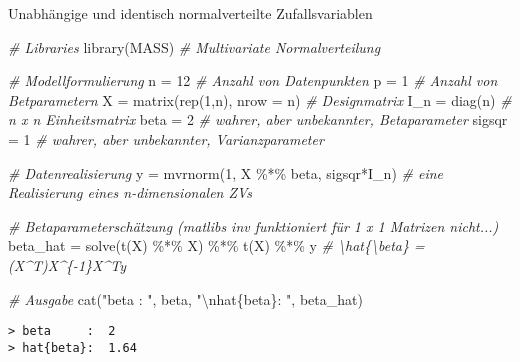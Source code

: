 \documentclass[
  8pt,
  ignorenonframetext,
]{beamer}
\newenvironment{Shaded}{\begin{snugshade}}{\end{snugshade}}
\newcommand{\AttributeTok}[1]{\textcolor[rgb]{0.77,0.63,0.00}{#1}}
\newcommand{\CommentTok}[1]{\textcolor[rgb]{0.56,0.35,0.01}{\textit{#1}}}
\newcommand{\DecValTok}[1]{\textcolor[rgb]{0.00,0.00,0.81}{#1}}
\newcommand{\FunctionTok}[1]{\textcolor[rgb]{0.00,0.00,0.00}{#1}}
\newcommand{\NormalTok}[1]{#1}
\newcommand{\OtherTok}[1]{\textcolor[rgb]{0.56,0.35,0.01}{#1}}
\newcommand{\SpecialCharTok}[1]{\textcolor[rgb]{0.00,0.00,0.00}{#1}}
\newcommand{\StringTok}[1]{\textcolor[rgb]{0.31,0.60,0.02}{#1}}
\begin{document}
\begin{frame}[fragile]{Unabhängige und identisch normalverteilte
Zufallsvariablen}
\protect\hypertarget{unabhuxe4ngige-und-identisch-normalverteilte-zufallsvariablen-3}{}
\footnotesize

\begin{Shaded}
\begin{Highlighting}[]
\CommentTok{\# Libraries}
\FunctionTok{library}\NormalTok{(MASS)                                    }\CommentTok{\# Multivariate Normalverteilung }

\CommentTok{\# Modellformulierung}
\NormalTok{n         }\OtherTok{=} \DecValTok{12}                                   \CommentTok{\# Anzahl von Datenpunkten}
\NormalTok{p         }\OtherTok{=} \DecValTok{1}                                    \CommentTok{\# Anzahl von Betparametern}
\NormalTok{X         }\OtherTok{=} \FunctionTok{matrix}\NormalTok{(}\FunctionTok{rep}\NormalTok{(}\DecValTok{1}\NormalTok{,n), }\AttributeTok{nrow =}\NormalTok{ n)           }\CommentTok{\# Designmatrix}
\NormalTok{I\_n       }\OtherTok{=} \FunctionTok{diag}\NormalTok{(n)                              }\CommentTok{\# n x n Einheitsmatrix}
\NormalTok{beta      }\OtherTok{=} \DecValTok{2}                                    \CommentTok{\# wahrer, aber unbekannter, Betaparameter}
\NormalTok{sigsqr    }\OtherTok{=} \DecValTok{1}                                    \CommentTok{\# wahrer, aber unbekannter, Varianzparameter}

\CommentTok{\# Datenrealisierung}
\NormalTok{y        }\OtherTok{=}  \FunctionTok{mvrnorm}\NormalTok{(}\DecValTok{1}\NormalTok{, X }\SpecialCharTok{\%*\%}\NormalTok{ beta, sigsqr}\SpecialCharTok{*}\NormalTok{I\_n)   }\CommentTok{\# eine Realisierung eines n{-}dimensionalen ZVs}

\CommentTok{\# Betaparameterschätzung (matlib\textquotesingle{}s inv funktioniert für 1 x 1 Matrizen nicht...)}
\NormalTok{beta\_hat }\OtherTok{=} \FunctionTok{solve}\NormalTok{(}\FunctionTok{t}\NormalTok{(X) }\SpecialCharTok{\%*\%}\NormalTok{ X) }\SpecialCharTok{\%*\%} \FunctionTok{t}\NormalTok{(X) }\SpecialCharTok{\%*\%}\NormalTok{ y      }\CommentTok{\# \textbackslash{}hat\{\textbackslash{}beta\} = (X\^{}T)X\^{}\{{-}1\}X\^{}Ty }

\CommentTok{\# Ausgabe}
\FunctionTok{cat}\NormalTok{(}\StringTok{"beta     : "}\NormalTok{, beta,}
    \StringTok{"}\SpecialCharTok{\textbackslash{}n}\StringTok{hat\{beta\}: "}\NormalTok{, beta\_hat)}
\end{Highlighting}
\end{Shaded}

\begin{verbatim}
> beta     :  2 
> hat{beta}:  1.64
\end{verbatim}
\end{frame}
\end{document}
